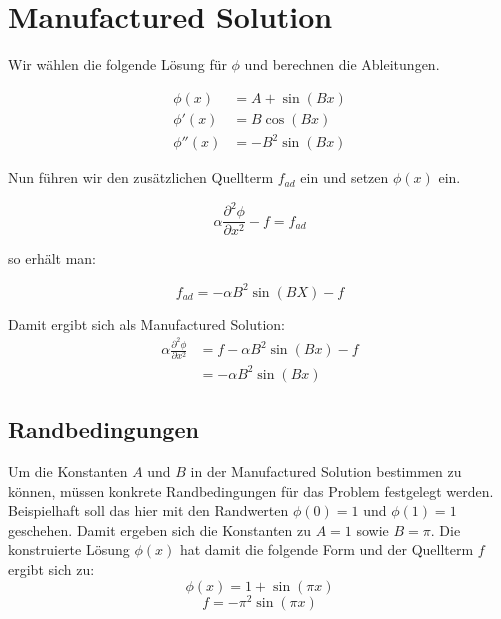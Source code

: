 \documentclass[10pt, ngerman,colorback,accentcolor=tud2d]{tudreport}
\begin{document}
\chapter{Manufactured Solution}

Wir wählen die folgende Lösung für $\phi$ und berechnen die Ableitungen.

\begin{align*}
  \phi(x) &= A + \sin(Bx)\\
  \phi'(x) &= B \cos(Bx)\\
  \phi''(x) &= -B^2\sin(Bx)
\end{align*}

Nun führen wir den zusätzlichen Quellterm $f_{ad}$ ein und setzen $\phi(x)$ ein.

\begin{equation*}
  \alpha\frac{\partial^2 \phi}{\partial x^2}-f=f_{ad}
\end{equation*}

so erhält man:

\begin{equation*}
  f_{ad} = -\alpha B^2\sin(BX)-f
\end{equation*}

Damit ergibt sich als Manufactured Solution:
\begin{align}
  \alpha\frac{\partial^2 \phi}{\partial x^2} &= f -\alpha B^2\sin(Bx)-f\\
                                             &= -\alpha B^2\sin(Bx)
\end{align}

\section{Randbedingungen}
\label{sec:Randbedingungen}

Um die Konstanten $A$ und $B$ in der Manufactured Solution bestimmen zu können,
müssen konkrete Randbedingungen für das Problem festgelegt werden. Beispielhaft
soll das hier mit den Randwerten $\phi(0) = 1$ und $\phi(1) = 1$ geschehen.
Damit ergeben sich die Konstanten zu $A = 1$ sowie $B = \pi$. Die 
konstruierte Lösung $\phi(x)$ hat damit die folgende Form und der Quellterm $f$
ergibt sich zu:
\begin{equation*}
  \phi(x) = 1 + \sin(\pi x)
\end{equation*}
\begin{equation}
  f=-\pi^2 \sin(\pi x)
  \label{eq:quellterm}
\end{equation}
\end{document}
